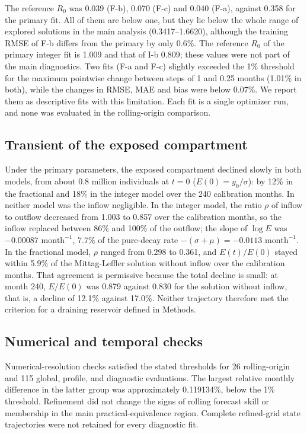\documentclass[pdflatex,sn-mathphys-ay,lineno]{sn-jnl}
\begin{document}
The reference $R_0$ was 0.039 (F-b), 0.070 (F-c) and 0.040 (F-a), against 0.358 for the primary fit. All of them are below one, but they lie below the whole range of explored solutions in the main analysis (0.3417--1.6620), although the training RMSE of F-b differs from the primary by only 0.6\%. The reference $R_0$ of the primary integer fit is 1.009 and that of I-b 0.809; these values were not part of the main diagnostics. Two fits (F-a and F-c) slightly exceeded the 1\% threshold for the maximum pointwise change between steps of 1 and 0.25 months (1.01\% in both), while the changes in RMSE, MAE and bias were below 0.07\%. We report them as descriptive fits with this limitation. Each fit is a single optimizer run, and none was evaluated in the rolling-origin comparison.

\subsection{Transient of the exposed compartment}\label{sec:trans}

Under the primary parameters, the exposed compartment declined slowly in both models, from about 0.8 million individuals at $t=0$ ($E(0)=y_0/\sigma$): by 12\% in the fractional and 18\% in the integer model over the 240 calibration months. In neither model was the inflow negligible. In the integer model, the ratio $\rho$ of inflow to outflow decreased from 1.003 to 0.857 over the calibration months, so the inflow replaced between 86\% and 100\% of the outflow; the slope of $\log E$ was $-0.00087\text{ month}^{-1}$, 7.7\% of the pure-decay rate $-(\sigma+\mu)=-0.0113\text{ month}^{-1}$. In the fractional model, $\rho$ ranged from 0.298 to 0.361, and $E(t)/E(0)$ stayed within 5.9\% of the Mittag-Leffler solution without inflow over the calibration months. That agreement is permissive because the total decline is small: at month 240, $E/E(0)$ was 0.879 against 0.830 for the solution without inflow, that is, a decline of 12.1\% against 17.0\%. Neither trajectory therefore met the criterion for a draining reservoir defined in Methods.

\subsection{Numerical and temporal checks}

Numerical-resolution checks satisfied the stated thresholds for 26 rolling-origin and 115 global, profile, and diagnostic evaluations. The largest relative monthly difference in the latter group was approximately 0.119134\%, below the 1\% threshold. Refinement did not change the signs of rolling forecast skill or membership in the main practical-equivalence region. Complete refined-grid state trajectories were not retained for every diagnostic fit.
\end{document}
